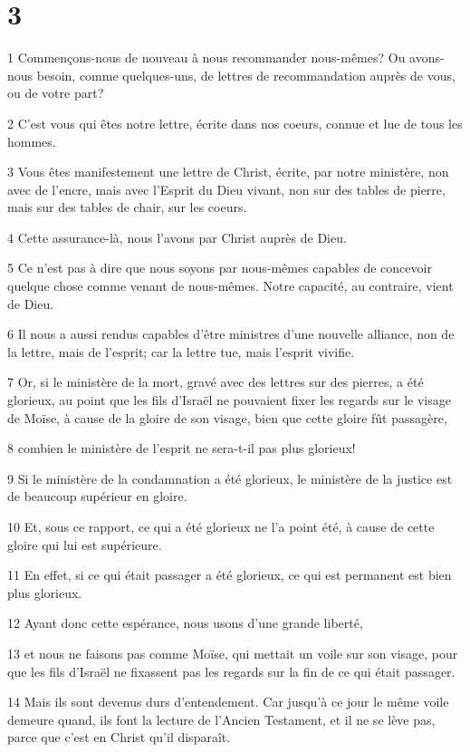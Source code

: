 \chapter{3}

\par 1 Commençons-nous de nouveau à nous recommander nous-mêmes? Ou avons-nous besoin, comme quelques-uns, de lettres de recommandation auprès de vous, ou de votre part?
\par 2 C'est vous qui êtes notre lettre, écrite dans nos coeurs, connue et lue de tous les hommes.
\par 3 Vous êtes manifestement une lettre de Christ, écrite, par notre ministère, non avec de l'encre, mais avec l'Esprit du Dieu vivant, non sur des tables de pierre, mais sur des tables de chair, sur les coeurs.
\par 4 Cette assurance-là, nous l'avons par Christ auprès de Dieu.
\par 5 Ce n'est pas à dire que nous soyons par nous-mêmes capables de concevoir quelque chose comme venant de nous-mêmes. Notre capacité, au contraire, vient de Dieu.
\par 6 Il nous a aussi rendus capables d'être ministres d'une nouvelle alliance, non de la lettre, mais de l'esprit; car la lettre tue, mais l'esprit vivifie.
\par 7 Or, si le ministère de la mort, gravé avec des lettres sur des pierres, a été glorieux, au point que les fils d'Israël ne pouvaient fixer les regards sur le visage de Moïse, à cause de la gloire de son visage, bien que cette gloire fût passagère,
\par 8 combien le ministère de l'esprit ne sera-t-il pas plus glorieux!
\par 9 Si le ministère de la condamnation a été glorieux, le ministère de la justice est de beaucoup supérieur en gloire.
\par 10 Et, sous ce rapport, ce qui a été glorieux ne l'a point été, à cause de cette gloire qui lui est supérieure.
\par 11 En effet, si ce qui était passager a été glorieux, ce qui est permanent est bien plus glorieux.
\par 12 Ayant donc cette espérance, nous usons d'une grande liberté,
\par 13 et nous ne faisons pas comme Moïse, qui mettait un voile sur son visage, pour que les fils d'Israël ne fixassent pas les regards sur la fin de ce qui était passager.
\par 14 Mais ils sont devenus durs d'entendement. Car jusqu'à ce jour le même voile demeure quand, ils font la lecture de l'Ancien Testament, et il ne se lève pas, parce que c'est en Christ qu'il disparaît.
